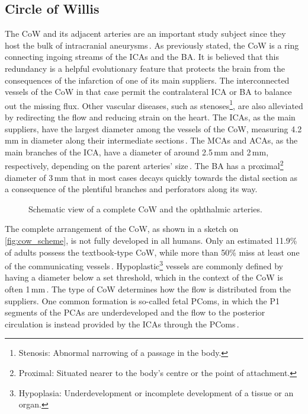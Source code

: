 \subsection{Circle of Willis}\label{chap3:sec1:subsec1}
The CoW and its adjacent arteries are an important study subject since they host the bulk of intracranial aneurysms\,\cite{Brown2014}. As previously stated, the CoW is a ring connecting ingoing streams of the ICAs and the BA\@. It is believed that this redundancy is a helpful evolutionary feature that protects the brain from the consequences of the infarction of one of its main suppliers. The interconnected vessels of the CoW in that case permit the contralateral ICA or BA to balance out the missing flux. Other vascular diseases, such as stenoses\footnote{Stenosis: Abnormal narrowing of a passage in the body.}, are also alleviated by redirecting the flow and reducing strain on the heart. The ICAs, as the main suppliers, have the largest diameter among the vessels of the CoW, measuring 4.2\,mm in diameter along their intermediate sections\,\cite{Baz2021}. The MCAs and ACAs, as the main branches of the ICA, have a diameter of around 2.5\,mm and 2\,mm, respectively, depending on the parent arteries' size\,\cite{Liebeskind2016}. The BA has a proximal\footnote{Proximal: Situated nearer to the body's centre or the point of attachment.} diameter of 3\,mm that in most cases decays quickly towards the distal section as a consequence of the plentiful branches and perforators along its way.

\begin{figure}[!htb]
	\centering
	\fontsize{11.200000}{12.800000}\selectfont
	\def\svgwidth{0.8\linewidth} 
	\vspace{0.3cm}
	\caption[Scheme of the Circle of Willis]{Schematic view of a complete CoW and the ophthalmic arteries\cite{Jeken-Rico2023}.}
	\label{fig:cow_scheme}
\end{figure}

The complete arrangement of the CoW, as shown in a sketch on \autoref{fig:cow_scheme}, is not fully developed in all humans. Only an estimated 11.9\% of adults possess the textbook-type CoW, while more than 50\% miss at least one of the communicating vessels\,\cite{Hindenes2020}. Hypoplastic\footnote{Hypoplasia: Underdevelopment or incomplete development of a tissue or an organ.} vessels are commonly defined by having a diameter below a set threshold, which in the context of the CoW is often 1\,mm\,\cite{Hindenes2020, Hindenes2023}. The type of CoW determines how the flow is distributed from the suppliers. One common formation is so-called fetal PComs, in which the P1 segments of the PCAs are underdeveloped and the flow to the posterior circulation is instead provided by the ICAs through the PComs\,\cite{Liebeskind2016}.

